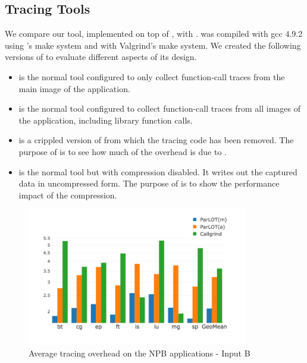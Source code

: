 \subsection{Tracing Tools}
\label{sec:tracing-tools}

We compare our \parlot tool, implemented on top of , with .
%
\parlot was compiled with gcc 4.9.2 using \pin 's make system and \callgrind with Valgrind's make system.
%
We created the following versions of \parlot to evaluate different aspects of its design.

\begin{itemize}
\item \textbf{\parlotm} is the normal \parlot tool configured to only collect function-call traces from the main image of the application.
\item \textbf{\parlota} is the normal \parlot tool configured to collect function-call traces from all images of the application, including library function calls.
\item \textbf{\pininit} is a crippled version of \parlot from which the tracing code has been removed.
%
The purpose of \pininit is to see how much of the overhead is due to \pin.
\item \textbf{\parlotnc} is the normal \parlot tool but with compression disabled.
%
It writes out the captured data in uncompressed form.
%
The purpose of \parlotnc is to show the performance impact of the compression.
\end{itemize}


\begin{figure}[t]
\centering
\includegraphics[width=3.8in]{figs.comet.newMed/comet_chartAvg_sd_B_p3_5.png}
\caption{Average tracing overhead on the NPB applications - Input B}
\label{comet_chartAvg_sd_B_p3_5}
\end{figure}

